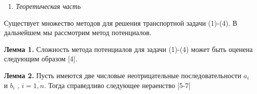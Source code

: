 
\begin{enumerate}
\def\labelenumi{\arabic{enumi}.}
\setcounter{enumi}{1}
\item
  \emph{Теоретическая часть}
\end{enumerate}

Существует множество методов для решения транспортной задачи (1)-(4). В
дальнейшем мы рассмотрим метод потенциалов.

{\bfseries Лемма 1.} Сложность метода потенциалов для задачи (1)-(4) может
быть оценена следующим образом {[}4{]}.


{\bfseries Лемма 2.} Пусть имеются две числовые неотрицательные
последовательности \(a_{i}\) и \(b_{i}\) , \(i = \overline{1,n}\). Тогда
справедливо следующее нераенство {[}5-7{]}

